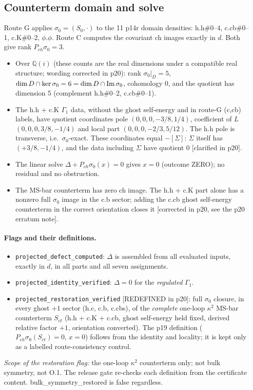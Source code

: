 \subsection{Counterterm domain and solve}
Route G applies $\sigma_0=(S_0,\cdot)$ to the 11 p14r domain densities: h.h\#0--4, c.cb\#0--1, c.K\#0--2,
$\phi.\phi$. Route C computes the covariant ch images exactly in $d$. Both give rank $P_{ch}\sigma_0=3$.
\begin{itemize}
\item Over $\mathbb Q(i)$ (these counts are the real dimensions under a compatible real structure; wording corrected
  in p20): rank $\sigma_0|_D=5$, $\dim D\cap\ker\sigma_0=6=\dim D\cap{\rm Im}\,
  \sigma_0$, cohomology 0, and the quotient has dimension 5 (complement h.h\#0--2, c.cb\#0--1).
\item The h.h + c.K $\Gamma_1$ data, without the ghost self-energy and in route-G (c,cb) labels, have quotient
  coordinates pole $(0,0,0,-3/8,1/4)$, coefficient of $L$
  $(0,0,0,3/8,-1/4)$ and local part $(0,0,0,-2/3,5/12)$. The h.h pole is transverse, i.e.\ $\sigma_0$-exact. These coordinates equal $-[\Sigma]$: $\Sigma$ itself has
  $(+3/8,-1/4)$, and the data including $\Sigma$ have quotient $0$ [clarified in p20].
\item The linear solve $\Delta+P_{ch}\sigma_0(x)=0$ gives $x=0$ (outcome ZERO); no residual and no obstruction.
\item The MS-bar counterterm has zero ch image. The h.h + c.K part alone has a nonzero full $\sigma_0$ image in the
  c.b sector; adding the c.cb ghost self-energy counterterm in the correct orientation closes it [corrected in p20,
  see the p20 erratum note].
\end{itemize}

\paragraph{Flags and their definitions.}
\begin{itemize}
\item \texttt{projected\_defect\_computed}: $\Delta$ is assembled from all evaluated inputs, exactly in $d$, in
  all parts and all seven assignments.
\item \texttt{projected\_identity\_verified}: $\Delta=0$ for the \emph{regulated} $\Gamma_1$.
\item \texttt{projected\_restoration\_verified} [REDEFINED in p20]: full $\sigma_0$ closure, in every ghost $+1$
  sector (h.c, c.b, c.cbs), of the \emph{complete} one-loop $\kappa^2$ MS-bar counterterm $S_{ct}$ (h.h + c.K + c.cb,
  ghost self-energy held fixed, derived relative factor $+1$, orientation converted). The p19 definition
  ($P_{ch}\sigma_0(S_{ct})=0$, $x=0$) follows from the identity and locality; it is kept only as a labelled
  route-consistency control.
\end{itemize}
\emph{Scope of the restoration flag:} the one-loop $\kappa^2$ counterterm only; not bulk symmetry, not O.1. The
release gate re-checks each definition from the certificate content. bulk\_symmetry\_restored is false regardless.

